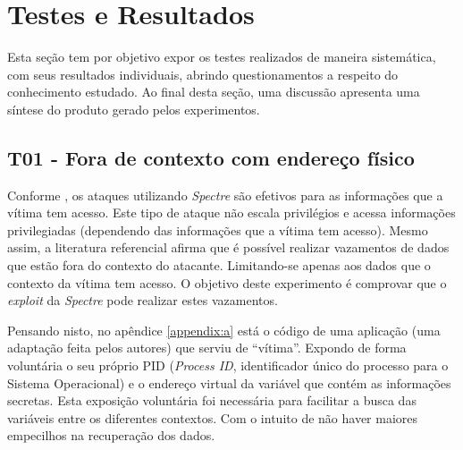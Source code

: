 \documentclass[
	article,			    %
	12pt,				    %
	oneside,			    %
	a4paper,			    %
	chapter=TITLE,		    %
	section=TITLE,		    %
	subsection=TITLE,	    %
	english,			    %
	brazil,				    %
	sumario=tradicional
]{abntex2}
\begin{document}
\section{Testes e Resultados}
Esta seção tem por objetivo expor os testes realizados de maneira sistemática, com seus resultados individuais, abrindo questionamentos a respeito do conhecimento estudado. Ao final desta seção, uma discussão apresenta uma síntese do produto gerado pelos experimentos.
\subsection{T01 - Fora de contexto com endereço físico}
Conforme , os ataques utilizando \emph{Spectre} são efetivos para as informações que a vítima tem acesso. Este tipo de ataque não escala privilégios e acessa informações privilegiadas (dependendo das informações que a vítima tem acesso). Mesmo assim, a literatura referencial afirma que é possível realizar vazamentos de dados que estão fora do contexto do atacante. Limitando-se apenas aos dados que o contexto da vítima tem acesso. O objetivo deste experimento é comprovar que o \emph{exploit} da \emph{Spectre} pode realizar estes vazamentos.

Pensando nisto, no apêndice \ref{appendix:a} está o código de uma aplicação (uma adaptação feita pelos autores) que serviu de ``vítima''. Expondo de forma voluntária o seu próprio PID (\emph{Process ID}, identificador único do processo para o Sistema Operacional) e o endereço virtual da variável que contém as informações secretas. Esta exposição voluntária foi necessária para facilitar a busca das variáveis entre os diferentes contextos. Com o intuito de não haver maiores empecilhos na recuperação dos dados.
\end{document}
